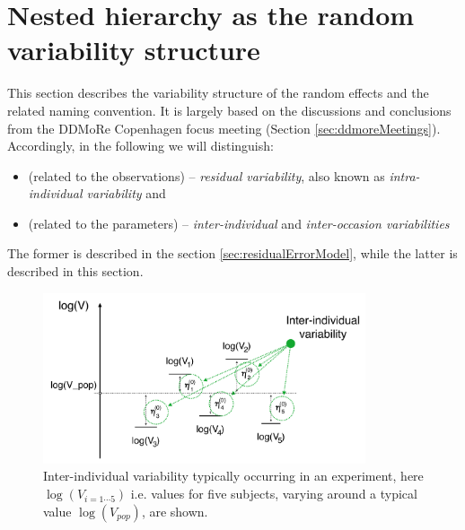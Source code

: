 \section{Nested hierarchy as the random variability structure}
\label{sec:variabilityModel}
\label{math:variability}

This section describes the variability structure of the random effects and the related naming 
convention. It is largely based on the discussions and conclusions from the DDMoRe 
Copenhagen focus 
meeting (Section \ref{sec:ddmoreMeetings}). Accordingly, in the following we will distinguish: 
\begin{itemize}
\item
(related to the observations) -- \textit{residual variability}, also known as \textit{intra-individual variability} and
\item
(related to the parameters) -- \textit{inter-individual} and \textit{inter-occasion variabilities}
\end{itemize}
The former is described in the section \ref{sec:residualErrorModel}, while the latter is described in this section.

\begin{figure}[htb!]
\centering
  \includegraphics[width=95mm]{pics/Subject-level.pdf}
 \caption{Inter-individual variability typically occurring in an experiment, here $\log(V_{i=1\cdots5})$ 
 i.e. values for five subjects, varying around a typical value $\log(V_{pop})$, are shown.}
 \label{fig:subjectLevelVariability}
\end{figure}

